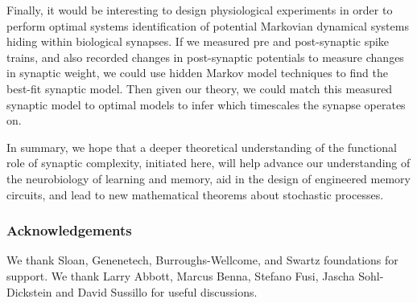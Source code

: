 \documentclass{article} %
\begin{document}
Finally, it would be interesting to design physiological experiments in order to perform optimal systems identification of potential Markovian dynamical systems hiding within biological synapses.
If we measured pre and post-synaptic spike trains, and also recorded changes in post-synaptic potentials to measure changes in synaptic weight, we could use hidden Markov model techniques to find the best-fit synaptic model.
Then given our theory, we could match this measured synaptic model to optimal models to infer which timescales the synapse operates on.

In summary, we hope that a deeper theoretical understanding of the functional role of synaptic complexity, initiated here, will help advance our understanding of the neurobiology of learning and memory, aid in the design of engineered memory circuits, and lead to new mathematical theorems about stochastic processes.



\subsubsection*{Acknowledgements}
We thank Sloan, Genenetech, Burroughs-Wellcome, and Swartz foundations for support.
We thank Larry Abbott, Marcus Benna, Stefano Fusi, Jascha Sohl-Dickstein and David Sussillo for useful discussions.





\end{document}
